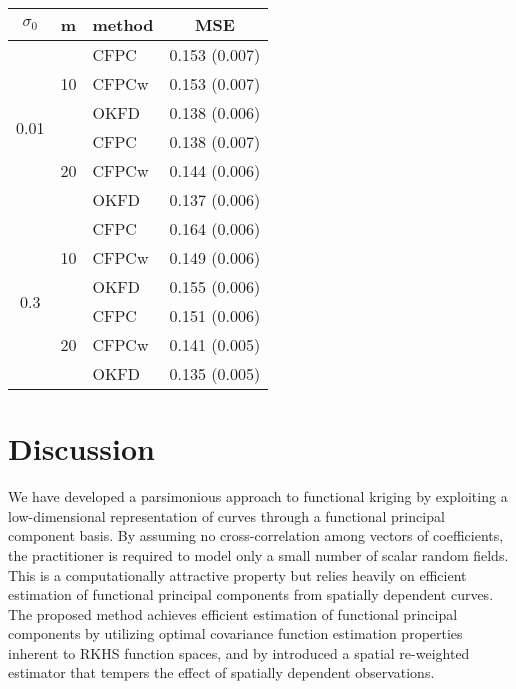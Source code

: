 \begin{table}
	\begin{center}
		\begin{tabular}{|c|c|l|c|} \hline
			$\sigma_0$ & m & method & MSE \\
			\hline
			\multirow{6}{*}{0.01}& \multirow{3}{*}{10}
			  &CFPC&  0.153  (0.007)  \\
			& &CFPCw& 0.153  (0.007)  \\
			& &OKFD& 0.138  (0.006) \\
			\cline{2-4} & \multirow{3}{*}{20}
			  &CFPC& 0.138  (0.007) \\
			& &CFPCw&  0.144  (0.006)  \\
			& &OKFD& 0.137  (0.006) \\
			\hline \multirow{6}{*}{0.3}& \multirow{3}{*}{10}
			  &CFPC& 0.164  (0.006)  \\
			& &CFPCw& 0.149  (0.006) \\
			& &OKFD& 0.155  (0.006) \\
			\cline{2-4} & \multirow{3}{*}{20}
			  &CFPC& 0.151  (0.006)  \\
			& &CFPCw& 0.141  (0.005) \\
			& &OKFD& 0.135  (0.005)  \\
			\hline
		\end{tabular}
	\label{tab:kriging_pred_2}
	\end{center}
\end{table}


\section{Discussion} %
\label{sec:discussion}
 We have developed a parsimonious approach to functional kriging by exploiting a low-dimensional representation of curves through a functional principal component basis. By assuming no cross-correlation among vectors of coefficients, the practitioner is required to model only a small number of scalar random fields. This is a computationally attractive property but relies heavily on efficient estimation of functional principal components from spatially dependent curves.  The proposed method achieves efficient estimation of functional principal components by utilizing optimal covariance function estimation properties inherent to RKHS function spaces, and by introduced a spatial re-weighted estimator that tempers the effect of spatially dependent observations. 

